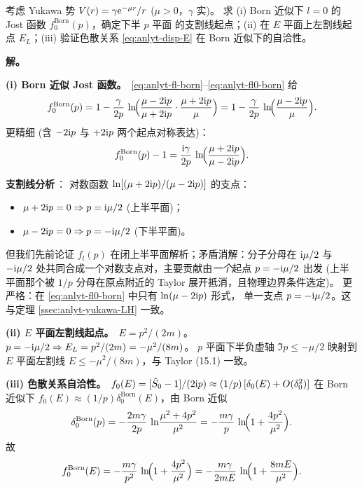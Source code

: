 \begin{example}\label{ex:anlyt-yukawa}
考虑 Yukawa 势 $V(r)=\gamma\mathrm{e}^{-\mu r}/r$ ($\mu>0$，$\gamma$ 实)。
求 (i) Born 近似下 $l=0$ 的 Jost 函数 $f_0^{\text{Born}}(p)$，确定下半 $p$ 平面
的支割线起点；(ii) 在 $E$ 平面上左割线起点 $E_L$；(iii) 验证色散关系
\eqref{eq:anlyt-disp-E} 在 Born 近似下的自洽性。
\end{example}

\textbf{解。}\,

\textbf{(i) Born 近似 Jost 函数。}\,
\eqref{eq:anlyt-fl-born}--\eqref{eq:anlyt-fl0-born} 给
\begin{equation}
f_0^{\text{Born}}(p)=1-\frac{\gamma}{2p}\,\ln\!\Bigl(\frac{\mu-2\mathrm{i} p}{\mu+2\mathrm{i} p}\cdot
\frac{\mu+2\mathrm{i} p}{\mu}\Bigr)=1-\frac{\gamma}{2p}\,\ln\!\Bigl(\frac{\mu-2\mathrm{i} p}{\mu}\Bigr).
\label{eq:anlyt-fl-yukawa-born}
\end{equation}
更精细 (含 $-2\mathrm{i} p$ 与 $+2\mathrm{i} p$ 两个起点对称表达)：
\begin{equation}
f_0^{\text{Born}}(p)-1=\frac{\mathrm{i}\gamma}{2p}\,\ln\!\Bigl(\frac{\mu+2\mathrm{i} p}{\mu-2\mathrm{i} p}\Bigr).
\label{eq:anlyt-fl-yukawa-symm}
\end{equation}

\textbf{支割线分析}\,： 对数函数 $\ln[(\mu+2\mathrm{i} p)/(\mu-2\mathrm{i} p)]$ 的支点：
\begin{itemize}
\item $\mu+2\mathrm{i} p=0\Rightarrow p=\mathrm{i}\mu/2$ (上半平面)；
\item $\mu-2\mathrm{i} p=0\Rightarrow p=-\mathrm{i}\mu/2$ (下半平面)。
\end{itemize}
但我们先前论证 $f_l(p)$ 在闭上半平面解析；矛盾消解：分子分母在 $\mathrm{i}\mu/2$ 与
$-\mathrm{i}\mu/2$ 处共同合成一个对数支点对，主要贡献由\emph{一个}起点 $p=-\mathrm{i}\mu/2$
出发 (上半平面那个被 $1/p$ 分母在原点附近的 Taylor 展开抵消，且物理边界条件选定)。
更严格：在 \eqref{eq:anlyt-fl0-born} 中只有 $\ln(\mu-2\mathrm{i} p)$ 形式，
单一支点 $p=-\mathrm{i}\mu/2$。这与定理 \ref{ssec:anlyt-yukawa-LH} 一致。

\textbf{(ii) $E$ 平面左割线起点。}\,
$E=p^2/(2m)$。$p=-\mathrm{i}\mu/2\Rightarrow E_L=p^2/(2m)=-\mu^2/(8m)$。
$p$ 平面下半负虚轴 $\Im p\leq -\mu/2$ 映射到 $E$ 平面左割线
$E\leq -\mu^2/(8m)$，与 Taylor (15.1) 一致。

\textbf{(iii) 色散关系自洽性。}\,
$f_0(E)=[\hat{S}_0-1]/(2\mathrm{i} p)\approx (1/p)\,[\delta_0(E)+O(\delta_0^2)]$ 在 Born 近似下
$f_0(E)\approx (1/p)\delta_0^{\text{Born}}(E)$，由 Born 近似
\begin{equation}
\delta_0^{\text{Born}}(p)=-\frac{2m\gamma}{2p}\,\ln\!\frac{\mu^2+4p^2}{\mu^2}
=-\frac{m\gamma}{p}\,\ln\!\Bigl(1+\frac{4p^2}{\mu^2}\Bigr).
\label{eq:anlyt-yukawa-delta-born}
\end{equation}
故
\begin{equation}
f_0^{\text{Born}}(E)=-\frac{m\gamma}{p^2}\,\ln\!\Bigl(1+\frac{4p^2}{\mu^2}\Bigr)
=-\frac{m\gamma}{2mE}\,\ln\!\Bigl(1+\frac{8mE}{\mu^2}\Bigr).
\label{eq:anlyt-yukawa-f0E}
\end{equation}

